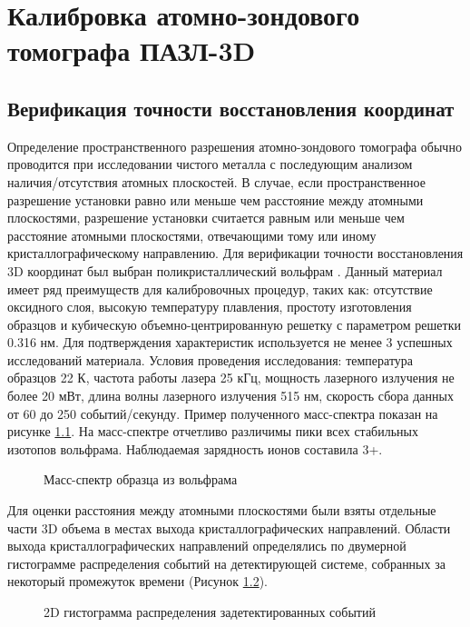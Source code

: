 \chapter{Калибровка атомно-зондового томографа ПАЗЛ-3D}\label{ch:ch3}

\section{Верификация точности восстановления координат}\label{sec:ch3/sect1}

Определение пространственного разрешения атомно-зондового томографа обычно проводится при исследовании чистого металла с последующим анализом наличия/отсутствия атомных плоскостей. В случае, если пространственное разрешение установки равно или меньше чем расстояние между атомными плоскостями, разрешение установки считается равным или меньше чем расстояние атомными плоскостями, отвечающими тому или иному кристаллографическому направлению. Для верификации точности восстановления 3D координат был выбран поликристаллический вольфрам  \cite{scbibAPPLE}. Данный материал имеет ряд преимуществ для калибровочных процедур, таких как: отсутствие оксидного слоя, высокую температуру плавления, простоту изготовления образцов и кубическую объемно-центрированную решетку с параметром решетки 0.316 нм. Для подтверждения характеристик используется не менее 3 успешных исследований материала. Условия проведения исследования: температура образцов 22 К, частота работы лазера 25 кГц, мощность лазерного излучения не более 20 мВт, длина волны лазерного излучения 515 нм, скорость сбора данных от 60 до 250 событий/секунду. Пример полученного масс-спектра показан на рисунке \cref{fig:W_massspectr}. На масс-спектре отчетливо различимы пики всех стабильных изотопов вольфрама. Наблюдаемая зарядность ионов составила 3+. 

\begin{figure}[htb]
	\caption{Масс-спектр образца из вольфрама}
	\label{fig:W_massspectr}
\end{figure}

Для оценки расстояния между атомными плоскостями были взяты отдельные части 3D объема в местах выхода кристаллографических направлений. Области выхода кристаллографических направлений определялись по двумерной гистограмме распределения событий на детектирующей системе, собранных за некоторый промежуток времени (Рисунок \cref{fig:W_3D}).

\begin{figure}[htb]
	\centerfloat{
		\texttt{[image: W\_3D]}
	}
	\caption{2D гистограмма распределения задетектированных событий}
	\label{fig:W_3D}
\end{figure}

